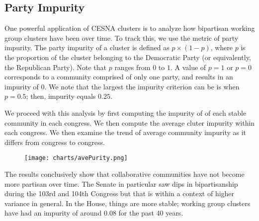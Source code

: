 \subsection{Party Impurity}

One powerful application of CESNA clusters is to analyze how bipartisan working
group clusters have been over time. To track this, we use the metric of party
impurity. The party impurity of a cluster is defined as $p \times (1-p)$, where
$p$ is the proportion of the cluster belonging to the Democratic Party (or
equivalently, the Republican Party). Note that $p$ ranges from $0$ to $1$. A
value of $p = 1$ or $p = 0$ corresponds to a community comprised of only one
party, and results in an impurity of $0$. We note that the largest the impurity
criterion can be is when $p = 0.5$; then, impurity equals $0.25$.

We proceed with this analysis by first computing the impurity of of each stable
community in each congress. We then compute the average cluter impurity within
each congress. We then examine the trend of average community impurity as it
differs from congress to congress.

\begin{figure}[h!]
    \texttt{[image: charts/avePurity.png]}
\end{figure}

The results conclusively show that collaborative communities have not become
more partisan over time. The Senate in particular saw dips in bipartisanship
during the 103rd and 104th Congress but that is within a context of higher
variance in general. In the House, things are more stable; working group
clusters have had an impurity of around 0.08 for the past 40 years.
